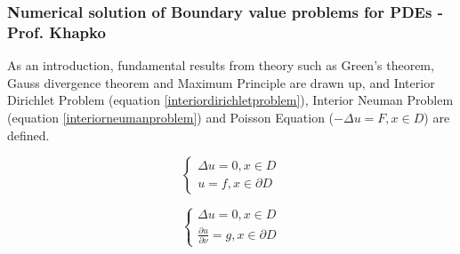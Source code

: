 \documentclass{article}
\begin{document}
\subsubsection{Numerical solution of Boundary value problems for PDEs - Prof. Khapko}

As an introduction, fundamental results from theory such as Green's theorem, Gauss divergence theorem and Maximum Principle are drawn up, and Interior Dirichlet Problem (equation \ref{interiordirichletproblem}), Interior Neuman Problem (equation \ref{interiorneumanproblem}) and Poisson Equation ($-\Delta u = F, x \in D$) are defined.

\begin{equation}\label{interiordirichletproblem}
   \begin{cases}
               \Delta u = 0, x \in D\\
               u = f, x \in \partial D
   \end{cases}
\end{equation}

\begin{equation}\label{interiorneumanproblem}
   \begin{cases}
               \Delta u = 0, x \in D\\
               \frac{\partial u}{\partial \nu} = g, x \in \partial D
   \end{cases}
\end{equation}
\end{document}

